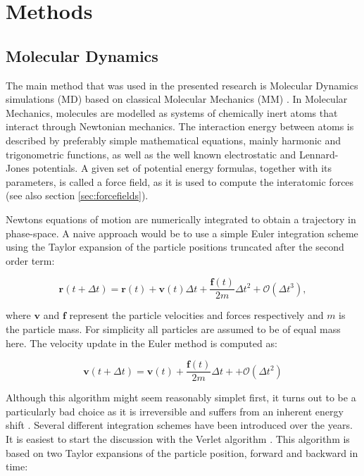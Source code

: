 \documentclass[english, a4paper, 12pt, titlepage, draft]{article}
\newcommand{\vect}[1]{\mathbf{#1}}
\newcommand{\vfun}[2]{\vect{#1}\left(#2\right)}
\begin{document}

\section{Methods}
\subsection{Molecular Dynamics}

The main method that was used in the presented research is Molecular Dynamics simulations (MD) based on classical Molecular Mechanics (MM) \cite{MDintro}.
In Molecular Mechanics, molecules are modelled as systems of chemically inert atoms that interact through Newtonian mechanics.
The interaction energy between atoms is described by preferably simple mathematical equations, mainly harmonic and trigonometric functions, as well as the well known electrostatic and Lennard-Jones potentials.
A given set of potential energy formulas, together with its parameters, is called a force field, as it is used to compute the interatomic forces (see also section \ref{sec:forcefields}).

Newtons equations of motion are numerically integrated to obtain a trajectory in phase-space.
A naive approach would be to use a simple Euler integration scheme \cite{Euler} using the Taylor expansion of the particle positions truncated after the second order term:

\begin{equation}
    \vfun{r}{t+\Delta t} = \vfun{r}{t} + \vfun{v}{t}\Delta t + \frac{\vfun{f}{t}}{2m} \Delta t^2 + \mathcal{O}(\Delta t^3),
    \label{eq:Euler}
\end{equation} 

 where $\vect{v}$ and $\vect{f}$ represent the particle velocities and forces respectively and $m$ is the particle mass. 
For simplicity all particles are assumed to be of equal mass here.
The velocity update in the Euler method is computed as:

\begin{equation}
    \vfun{v}{t+\Delta t} = \vfun{v}{t} + \frac{\vfun{f}{t}}{2m} \Delta t+ + \mathcal{O}(\Delta t^2)
\end{equation}

Although this algorithm might seem reasonably simplet first, it turns out to be a particularly bad choice as it is irreversible and suffers from an inherent energy shift \cite{FrenkelSmit}.
Several different integration schemes have been introduced over the years.
It is easiest to start the discussion with the Verlet algorithm \cite{Verlet}.
This algorithm is based on two Taylor expansions of the particle position, forward and backward in time:
\end{document}
